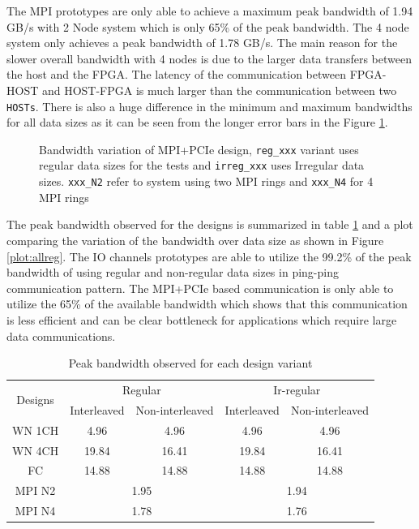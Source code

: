 The MPI prototypes are only able to achieve a maximum peak bandwidth of 1.94 GB/s with 2 Node system
which is only 65\% of the peak bandwidth. The 4 node system only achieves a peak bandwidth of
1.78 GB/s. The main reason for the slower overall bandwidth with 4 nodes is due to the larger
data transfers between the host and the FPGA. The latency of the communication between FPGA-HOST
and HOST-FPGA is much larger than the communication between two \texttt{HOSTs}. There is also a huge difference
in the minimum and maximum bandwidths for all data sizes as it can be seen from the longer error bars in the
Figure \ref{plot:mpipcie}.
\begin{figure}[ht]
    \centering
    \scalebox{0.7}{}
    \caption{Bandwidth variation of MPI+PCIe design,
    \texttt{reg\_xxx} variant uses regular data sizes for the tests and \texttt{irreg\_xxx} uses Irregular data sizes.
    \texttt{xxx\_N2} refer to system using two MPI rings and \texttt{xxx\_N4} for 4 MPI rings}
    \label{plot:mpipcie}
\end{figure}

The peak bandwidth observed for the designs is summarized in table \ref{tab:obs_peakbw} and a plot comparing the variation
of the bandwidth over data size as shown in Figure \ref{plot:allreg}. The IO channels prototypes are able
to utilize the 99.2\% of the peak bandwidth of using regular and non-regular data sizes in ping-ping
communication pattern. The MPI+PCIe based communication is only able to utilize the 65\% of the available
bandwidth which shows that this communication is less efficient and can be clear bottleneck for applications
which require large data communications.
\begin{table}[ht]
    \centering
    \begin{tabular}{ccccc}
    \multicolumn{1}{c}{\multirow{2}{*}{Designs}} & \multicolumn{2}{c}{Regular} & \multicolumn{2}{c}{Ir-regular} \\ \cline{2-5}
    \multicolumn{1}{c}{} & Interleaved & \multicolumn{1}{c}{Non-interleaved} & Interleaved & \multicolumn{1}{c}{Non-interleaved} \\ \hline
    WN 1CH & \multicolumn{1}{c}{4.96} & 4.96 & \multicolumn{1}{c}{4.96} & 4.96 \\ \hline
    WN 4CH & \multicolumn{1}{c}{19.84} & 16.41 & \multicolumn{1}{c}{19.84} & 16.41 \\ \hline
    FC & \multicolumn{1}{c}{14.88} & 14.88 & \multicolumn{1}{c}{14.88} & 14.88 \\ \hline
    MPI N2 & \multicolumn{2}{c}{1.95} & \multicolumn{2}{c}{1.94} \\ \hline
    MPI N4 & \multicolumn{2}{c}{1.78} & \multicolumn{2}{c}{1.76} \\ \hline
    \end{tabular}%
    \caption{Peak bandwidth observed for each design variant}
    \label{tab:obs_peakbw}
\end{table}

